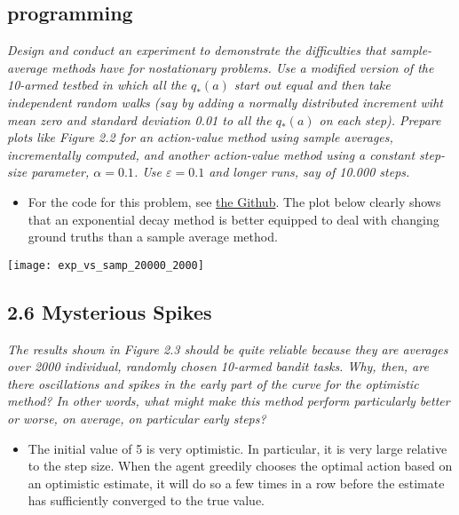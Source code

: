 \documentclass{article}
\begin{document}
\subsection{programming}
\textit{Design and conduct an experiment to demonstrate the difficulties that sample-average methods have for nostationary problems. Use a modified version of the 10-armed testbed in which all the $q_* (a)$ start out equal and then take independent random walks (say by adding a normally distributed increment wiht mean zero and standard deviation 0.01 to all the $q_* (a)$ on each step). Prepare plots like Figure 2.2 for an action-value method using sample averages, incrementally computed, and another action-value method using a constant step-size parameter, $\alpha = 0.1$. Use $\varepsilon = 0.1$ and longer runs, say of 10.000 steps. }
\begin{itemize}
\item For the code for this problem, see \href{https://github.com/kenbeek/reinforcement-learning-sutton-barto/tree/main/rlcode/chapter02}{the Github}. The plot below clearly shows that an exponential decay method is better equipped to deal with changing ground truths than a sample average method.
\end{itemize}
\texttt{[image: exp\_vs\_samp\_20000\_2000]}


\subsection{2.6 Mysterious Spikes}
\textit{The results shown in Figure 2.3 should be quite reliable because they are averages over 2000 individual, randomly chosen 10-armed bandit tasks. Why, then, are there oscillations and spikes in the early part of the curve for the optimistic method? In other words, what might make this method perform particularly better or worse, on average, on particular early steps?}
\begin{itemize}
\item The initial value of 5 is very optimistic. In particular, it is very large relative to the step size. When the agent greedily chooses the optimal action based on an optimistic estimate, it will do so a few times in a row before the estimate has sufficiently converged to the true value.
\end{itemize}
\end{document}

